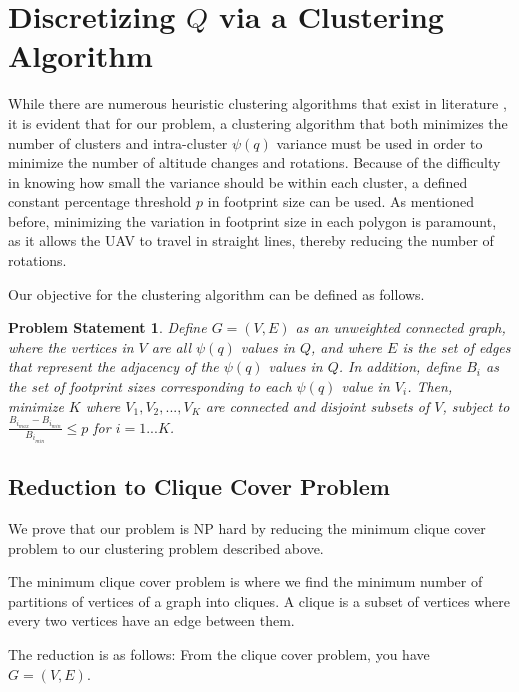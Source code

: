 \documentclass[conference]{IEEEtran}
\theoremstyle{plain}%
\newtheorem{problem}{Problem Statement}
\begin{document}
\section{Discretizing $Q$ via a Clustering Algorithm} \label{clustering}
While there are numerous heuristic clustering algorithms that exist in literature \cite{xu2005survey}, it is evident that for our problem, a clustering algorithm that both minimizes the number of clusters and intra-cluster $\psi(q)$ variance must be used in order to minimize the number of altitude changes and rotations. Because of the difficulty in knowing how small the variance should be within each cluster, a defined constant percentage threshold $p$ in footprint size can be used. As mentioned before, minimizing the variation in footprint size in each polygon is paramount, as it allows the UAV to travel in straight lines, thereby reducing the number of rotations.

Our objective for the clustering algorithm can be defined as follows.

\begin{problem}
Define $G=(V,E)$ as an unweighted connected graph, where the vertices in $V$ are all $\psi(q)$ values in $Q$, and where $E$ is the set of edges that represent the adjacency of the $\psi(q)$ values in $Q$. In addition, define $B_i$ as the set of footprint sizes corresponding to each $\psi(q)$ value in $V_i$. Then, minimize $K$ where $V_1, V_2, ..., V_K$ are connected and disjoint subsets of $V$, subject to $\frac{B_{i_{max}}-B_{i_{min}}}{B_{i_{min}}} \leq p$ for $i = 1...K$.
\end{problem}

\subsection{Reduction to Clique Cover Problem}
We prove that our problem is NP hard by reducing the minimum clique cover problem to our clustering problem described above.

The minimum clique cover problem is where we find the minimum number of partitions of vertices of a graph into cliques. A clique is a subset of vertices where every two vertices have an edge between them.

The reduction is as follows:
From the clique cover problem, you have $G=(V,E)$.



\end{document}
